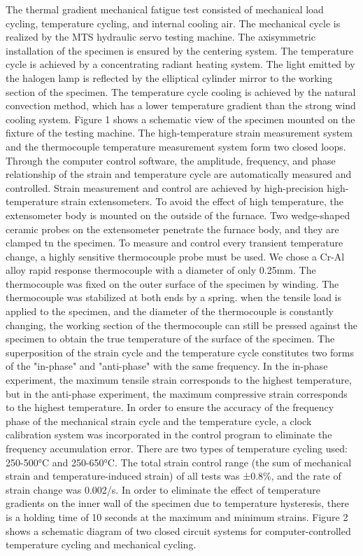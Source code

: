 The thermal gradient mechanical fatigue test consisted of mechanical load cycling, temperature cycling, and internal cooling air. The mechanical cycle is realized by the MTS hydraulic servo testing machine. The axisymmetric installation of the specimen is ensured by the centering system. The temperature cycle is achieved by a concentrating radiant heating system. The light emitted by the halogen lamp is reflected by the elliptical cylinder mirror to the working section of the specimen. The temperature cycle cooling is achieved by the natural convection method, which has a lower temperature gradient than the strong wind cooling system. Figure 1 shows a schematic view of the specimen mounted on the fixture of the testing machine. The high-temperature strain measurement system and the thermocouple temperature measurement system form two closed loops. Through the computer control software, the amplitude, frequency, and phase relationship of the strain and temperature cycle are automatically measured and controlled. Strain measurement and control are achieved by high-precision high-temperature strain extensometers. To avoid the effect of high temperature, the extensometer body is mounted on the outside of the furnace. Two wedge-shaped ceramic probes on the extensometer penetrate the furnace body, and they are clamped tn the specimen. To measure and control every transient temperature change, a highly sensitive thermocouple probe must be used. We chose a Cr-Al alloy rapid response thermocouple with a diameter of only 0.25mm. The thermocouple was fixed on the outer surface of the specimen by winding. The thermocouple was stabilized at both ends by a spring. when the tensile load is applied to the specimen, and the diameter of the thermocouple is constantly changing, the working section of the thermocouple can still be pressed against the specimen to obtain the true temperature of the surface of the specimen. The superposition of the strain cycle and the temperature cycle constitutes two forms of the "in-phase" and "anti-phase" with the same frequency. In the in-phase experiment, the maximum tensile strain corresponds to the highest temperature, but in the anti-phase experiment, the maximum compressive strain corresponds to the highest temperature. In order to ensure the accuracy of the frequency phase of the mechanical strain cycle and the temperature cycle, a clock calibration system was incorporated in the control program to eliminate the frequency accumulation error. There are two types of temperature cycling used: 250-500°C and 250-650°C. The total strain control range (the sum of mechanical strain and temperature-induced strain) of all tests was ±0.8\%, and the rate of strain change was 0.002/s. In order to eliminate the effect of temperature gradients on the inner wall of the specimen due to temperature hysteresis, there is a holding time of 10 seconds at the maximum and minimum strains. Figure 2 shows a schematic diagram of two closed circuit systems for computer-controlled temperature cycling and mechanical cycling.

